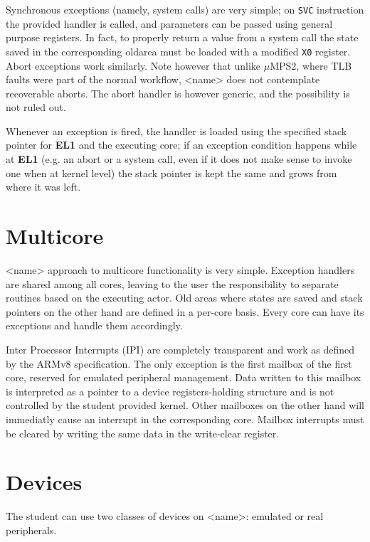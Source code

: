 \documentclass[12pt,a4paper,openright,twoside]{report}
\begin{document}
Synchronous exceptions (namely, system calls) are very simple; on {\tt SVC} 
instruction the provided handler is called, and parameters can be passed using
general purpose registers. In fact, to properly return a value from a system call
the state saved in the corresponding oldarea must be loaded with a modified 
{\tt X0} register.\\

Abort exceptions work similarly. Note however that unlike $\mu$MPS2, where TLB
faults were part of the normal workflow, <name> does not contemplate recoverable
aborts. The abort handler is however generic, and the possibility is not ruled
out.

Whenever an exception is fired, the handler is loaded using the specified stack
pointer for \textbf{EL1} and the executing core; if an exception condition happens
while at \textbf{EL1} (e.g. an abort or a system call, even if it does not make 
sense to invoke one when at kernel level) the stack pointer is kept the same
and grows from where it was left.

\section{Multicore}
<name> approach to multicore functionality is very simple. Exception handlers 
are shared among all cores, leaving to the user the responsibility to separate
routines based on the executing actor. Old areas where states are saved and stack
pointers on the other hand are defined in a per-core basis. Every core can have
its exceptions and handle them accordingly.

Inter Processor Interrupts (IPI) are completely transparent and work as defined
by the ARMv8 specification. The only exception is the first mailbox of the first
core, reserved for emulated peripheral management. Data written to this mailbox
is interpreted as a pointer to a device registers-holding structure and is not
controlled by the student provided kernel.
Other mailboxes on the other hand will immediatly cause an interrupt in the
corresponding core. Mailbox interrupts must be cleared by writing the same data
in the write-clear register.

\section{Devices}
The student can use two classes of devices on <name>: emulated or real peripherals.
\end{document}
